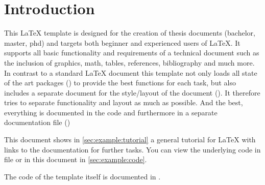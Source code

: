 
\chapter{Introduction}

This \LaTeX{} template is designed for the creation of thesis documents (bachelor, master, phd) and targets both beginner and experienced users of \LaTeX{}. It supports all basic functionality and requirements of a technical document such as the inclusion of graphics, math, tables, references, bibliography and much more. In contrast to a standard LaTeX document this template not only loads all state of the art packages () to provide the best functions for each task, but also includes a separate document for the style/layout of the document (). It therefore tries to separate functionality and layout as much as possible. And the best, everything is documented in the code and furthermore in a separate documentation file ()

This document shows in \cref{sec:example:tutorial} a general tutorial for \LaTeX{} with links to the documentation for further tasks. You can view the underlying code in file  or in this document in \cref{sec:example:code}.

The code of the template itself is documented in .